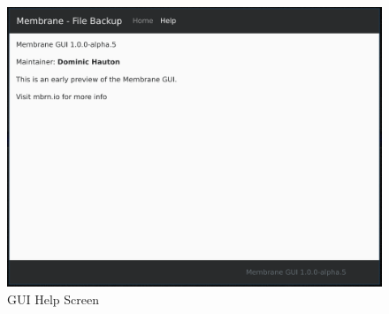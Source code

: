 \documentclass[11pt, a4paper, twocolumn, twoside]{report}
\begin{document}
\begin{figure}[!htb]
 \centering
 \includegraphics[width=\textwidth]{gui-help}
 \caption{GUI Help Screen}
 \label{fig:gui-help}
\end{figure}
\end{document}
